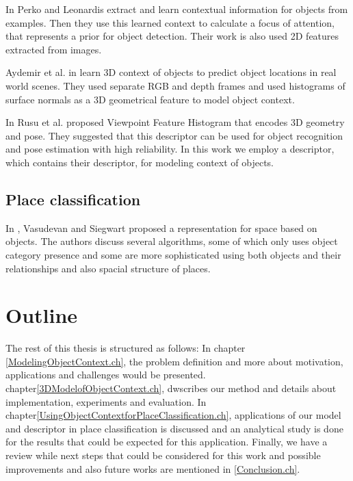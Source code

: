      In \cite{PerkoLeonardisContextDriven} Perko and Leonardis extract and learn contextual information for objects from examples.
     Then they use this learned context to calculate a focus of attention, that represents a prior for object detection. Their work is 
     also used 2D features extracted from images. 
 
      Aydemir et al. in \cite{aydemir2012_3Dcontext} learn 3D context of objects to predict object locations in 
      real world scenes. 
      They used separate RGB and depth frames and used histograms of surface normals as a 3D geometrical feature
      to model object context.
      
    In \cite{5651280} Rusu et al. proposed Viewpoint Feature Histogram that encodes 3D geometry and pose. They suggested that this descriptor
    can be used for object recognition and pose estimation with high reliability.
    In this work we employ a descriptor, which contains their descriptor, for modeling context of objects.
     
\subsection*{Place classification}

    In \cite{Vasudevan2008522}, Vasudevan and Siegwart proposed a representation for space based on objects. 
    The authors discuss several algorithms, some of which only uses object category presence and some are more sophisticated using both 
    objects and their relationships and also spacial structure of places.
     
\section {Outline}
\label{Outline.sec}
The rest of this thesis is structured as follows:
In chapter \ref{ModelingObjectContext.ch}, the problem definition and more about motivation, applications and challenges would be 
presented.
chapter\ref{3DModelofObjectContext.ch}, dwscribes our method and details about implementation, experiments and evaluation. 
In chapter\ref{UsingObjectContextforPlaceClassification.ch}, applications of our model and descriptor in place classification is 
discussed and an analytical study is done for the results that could be expected for this application.
Finally, we have a review while next steps that could be considered for this work and possible improvements 
and also future works are mentioned in \ref{Conclusion.ch}.

